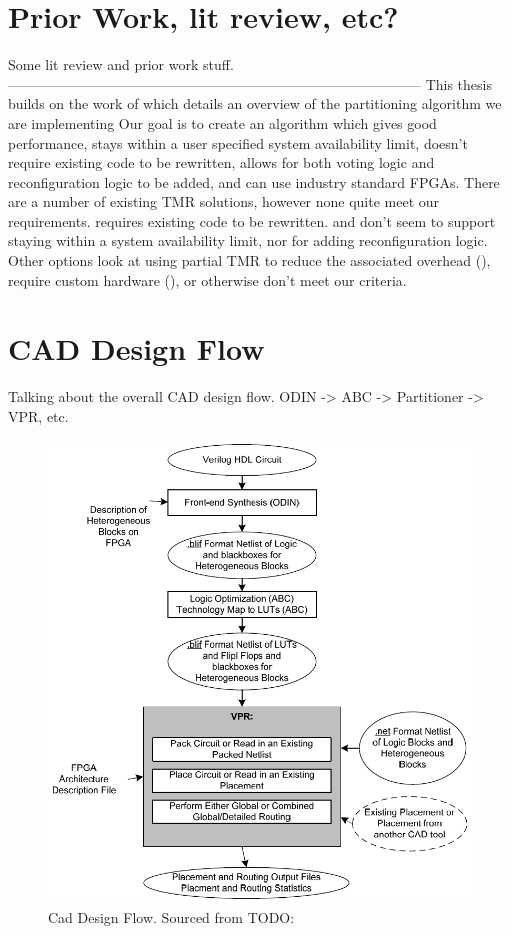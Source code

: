\documentclass[12pt,drafta4paper,oneside]{memoir} %
\begin{document}
\section{Prior Work, lit review, etc?}
Some lit review and prior work stuff.
-----------------------------------------------------------------------------------------
This thesis builds on the work of  which details an overview of the partitioning algorithm we are implementing
Our goal is to create an algorithm which gives good performance, stays within a user specified system availability limit, doesn't require existing code to be rewritten, allows for both voting logic and reconfiguration logic to be added, and can use industry standard \acp{FPGA}. There are a number of existing \ac{TMR} solutions, however none quite meet our requirements.
\cite{ftmr} requires existing code to be rewritten.
\cite{synplify} and \cite{tmrtool} don't seem to support staying within a system availability limit, nor for adding reconfiguration logic.
Other options look at using partial \ac{TMR} to reduce the associated overhead (\cite{partialTMR}), require custom hardware (\cite{VFPGATMR}), or otherwise don't meet our criteria.


\section{CAD Design Flow}
Talking about the overall CAD design flow. ODIN -> ABC -> Partitioner -> VPR, etc.
\begin{figure}
    \includegraphics[width=\textwidth]{images/vpr-cad.png}
    \caption{Cad Design Flow. Sourced from TODO:}
    \label{CADFlow}
\end{figure}
\end{document}
